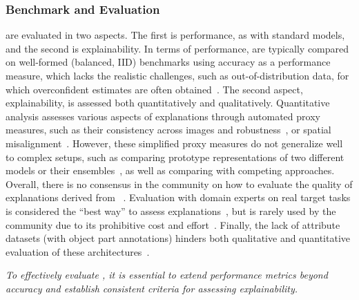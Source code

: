 \subsubsection{\texorpdfstring{\colorbox[RGB]{156,198,246}{Benchmark and Evaluation}}{Benchmark and Evaluation}}
\label{sssec:chall:method:bench}
\ppms are evaluated in two aspects. The first is performance, as with standard models, and the second is explainability.
In terms of performance, \ppms are typically compared on well-formed (balanced, IID) benchmarks using accuracy as a performance measure, which lacks the realistic challenges, such as out-of-distribution data, for which overconfident estimates are often obtained~\citep{Nauta2023_wcxai_co-12-for-prototype-models}.
The second aspect, explainability, is assessed both quantitatively and qualitatively. Quantitative analysis assesses various aspects of explanations through automated proxy measures, such as their consistency across images and robustness~\citep{Huang_2023_EvaluationImprovementInterpretability}, or spatial misalignment~\citep{Sacha_2024_Interpretabilitybenchmarkevaluating}. However, these simplified proxy measures do not generalize well to complex setups, such as comparing prototype representations of two different models or their ensembles~\citep{Keswani_2022_Proto2ProtoCanyou}, as well as comparing with competing approaches.
Overall, there is no consensus in the community on how to evaluate the quality of explanations derived from \ppms~\citep{Nauta2023_wcxai_co-12-for-prototype-models,Nauta2023_csur_evaluating-xai-survey}. 
Evaluation with domain experts on real target tasks is considered the ``best way'' to assess explanations~\citep{doshi2017towards}, but is rarely used by the community due to its prohibitive cost and effort~\citep{Nauta2023_csur_evaluating-xai-survey}.
Finally, the lack of attribute datasets (with object part annotations) hinders both qualitative and quantitative evaluation of these architectures~\citep{Ruis_2021_IndependentPrototypePropagation}.

\textit{To effectively evaluate \ppms, it is essential to extend performance metrics beyond accuracy and establish consistent criteria for assessing explainability.}
